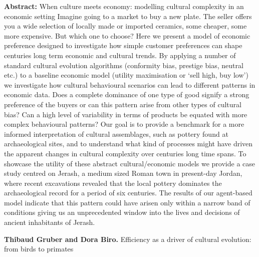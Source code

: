 \documentclass[]{article}
\begin{document}
\textbf{Abstract:} When culture meets economy: modelling cultural
complexity in an economic setting Imagine going to a market to buy a new
plate. The seller offers you a wide selection of locally made or
imported ceramics, some cheaper, some more expensive. But which one to
choose? Here we present a model of economic preference designed to
investigate how simple customer preferences can shape centuries long
term economic and cultural trends. By applying a number of standard
cultural evolution algorithms (conformity bias, prestige bias, neutral
etc.) to a baseline economic model (utility maximisation or `sell high,
buy low') we investigate how cultural behavioural scenarios can lead to
different patterns in economic data. Does a complete dominance of one
type of good signify a strong preference of the buyers or can this
pattern arise from other types of cultural bias? Can a high level of
variability in terms of products be equated with more complex
behavioural patterns? Our goal is to provide a benchmark for a more
informed interpretation of cultural assemblages, such as pottery found
at archaeological sites, and to understand what kind of processes might
have driven the apparent changes in cultural complexity over centuries
long time spans. To showcase the utility of these abstract
cultural/economic models we provide a case study centred on Jerash, a
medium sized Roman town in present-day Jordan, where recent excavations
revealed that the local pottery dominates the archaeological record for
a period of six centuries. The results of our agent-based model indicate
that this pattern could have arisen only within a narrow band of
conditions giving us an unprecedented window into the lives and
decisions of ancient inhabitants of Jerash.

{\bf {Thibaud Gruber and Dora Biro}. }{Efficiency as a driver of cultural
evolution: from birds to primates}
\end{document}
